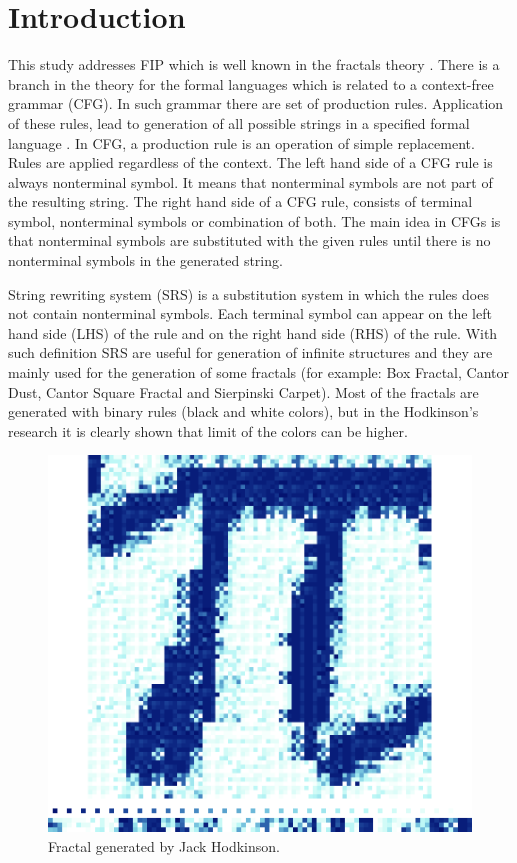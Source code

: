 \documentclass[runningheads]{llncs}
\begin{document}
\section{Introduction} \label{Introduction}

This study addresses FIP which is well known in the fractals theory \cite{guerin01,nettleton01}. There is a branch in the theory for the formal languages which is related to a context-free grammar (CFG). In such grammar there are set of production rules. Application of these rules, lead to generation of all possible strings in a specified formal language \cite{ochoa01}. In CFG, a production rule is an operation of simple replacement. Rules are applied regardless of the context. The left hand side of a CFG rule is always nonterminal symbol. It means that nonterminal symbols are not part of the resulting string. The right hand side of a CFG rule, consists of terminal symbol, nonterminal symbols or combination of both. The main idea in CFGs is that nonterminal symbols are substituted with the given rules until there is no nonterminal symbols in the generated string.

String rewriting system (SRS) is a substitution system in which the rules does not contain nonterminal symbols. Each terminal symbol can appear on the left hand side (LHS) of the rule and on the right hand side (RHS) of the rule. With such definition SRS are useful for generation of infinite structures and they are mainly used for the generation of some fractals (for example: Box Fractal, Cantor Dust, Cantor Square Fractal and Sierpinski Carpet). Most of the fractals are generated with binary rules (black and white colors), but in the Hodkinson's research it is clearly shown that limit of the colors can be higher.

\begin{figure}[h!]
  \centering
  \includegraphics[width=0.5\linewidth]{pic01}
  \caption{Fractal generated by Jack Hodkinson.}
\label{fig:pic01}
\end{figure}
\end{document}
